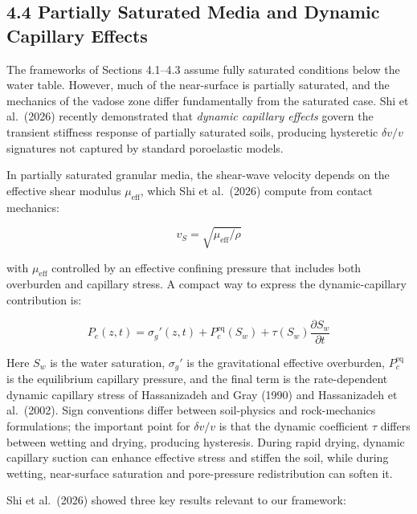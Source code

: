 \documentclass[draft]{agujournal2019}
\begin{document}
\subsection{4.4 Partially Saturated Media and Dynamic Capillary
Effects}\label{partially-saturated-media-and-dynamic-capillary-effects}

The frameworks of Sections 4.1--4.3 assume fully saturated conditions
below the water table. However, much of the near-surface is partially
saturated, and the mechanics of the vadose zone differ fundamentally
from the saturated case. Shi et al.~(2026) recently demonstrated that
\emph{dynamic capillary effects} govern the transient stiffness response
of partially saturated soils, producing hysteretic \(\delta v/v\)
signatures not captured by standard poroelastic models.

In partially saturated granular media, the shear-wave velocity depends
on the effective shear modulus \(\mu_{\text{eff}}\), which Shi et
al.~(2026) compute from contact mechanics:

\[v_S = \sqrt{\mu_{\text{eff}} / \rho} \tag{10}\]

with \(\mu_{\text{eff}}\) controlled by an effective confining pressure
that includes both overburden and capillary stress. A compact way to
express the dynamic-capillary contribution is:

\[P_e(z,t) = \sigma_g'(z,t) + P_c^{\mathrm{eq}}(S_w) + \tau(S_w)\frac{\partial S_w}{\partial t} \tag{11}\]

Here \(S_w\) is the water saturation, \(\sigma_g'\) is the gravitational
effective overburden, \(P_c^{\mathrm{eq}}\) is the equilibrium capillary
pressure, and the final term is the rate-dependent dynamic capillary
stress of Hassanizadeh and Gray (1990) and Hassanizadeh et al.~(2002).
Sign conventions differ between soil-physics and rock-mechanics
formulations; the important point for \(\delta v/v\) is that the dynamic
coefficient \(\tau\) differs between wetting and drying, producing
hysteresis. During rapid drying, dynamic capillary suction can enhance
effective stress and stiffen the soil, while during wetting,
near-surface saturation and pore-pressure redistribution can soften it.

Shi et al.~(2026) showed three key results relevant to our framework:
\end{document}
